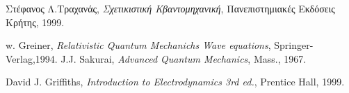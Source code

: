 \documentclass[12pt,oneside,titlepage,a4paper]{article}
\begin{document}

\begin{thebibliography}{9}

  Στέφανος Λ.Τραχανάς,
  \emph{Σχετικιστική Κβαντομηχανική},
  Πανεπιστημιακές Εκδόσεις Κρήτης, 1999.


   w. Greiner,
  \emph{Relativistic Quantum Mechanichs Wave equations},
  Springer-Verlag,1994.
   J.J. Sakurai,
  \emph{Advanced Quantum Mechanics},
  Mass., 1967.

  David J. Griffiths,
  \emph{Introduction to Electrodynamics 3rd ed.},
  Prentice Hall, 1999.

\end{thebibliography}
\end{document}
